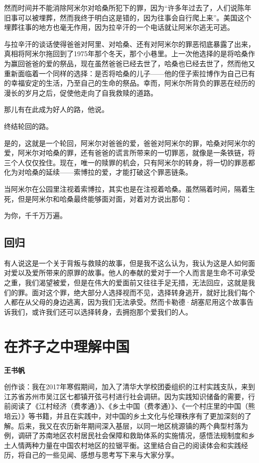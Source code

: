 \documentclass[openany,scheme = chinese, linespread = 1.5]{ctexbook}
\newcommand \name[1]{\begin{center} \kaishu \Large \bfseries #1 \end{center}}
\begin{document}
然而时间并不能消除阿米尔对哈桑所犯下的罪，因为“许多年过去了，人们说陈年旧事可以被埋葬，然而我终于明白这是错的，因为往事会自行爬上来”。美国这个埋葬往事的地方也毫无作用，因为拉辛汗的一个电话就让阿米尔逃无可逃。

与拉辛汗的谈话使得爸爸对阿里、对哈桑、还有对阿米尔的罪恶彻底暴露了出来，真相将阿米尔拖回到了1975年那个冬天，那个小巷里。上一次他选择的是将哈桑作为赢回爸爸的爱的祭品，现在虽然爸爸已经去世了，哈桑也已经去世了，然而他又重新面临着一个同样的选择：是否将哈桑的儿子——他的侄子索拉博作为自己已有的幸福安定的生活，乃至自己的生命的祭品。幸而，阿米尔所背负的罪恶在经历的漫长的岁月之后，促使他走向了自我救赎的道路。

那儿有在此成为好人的路，他说。

终结轮回的路。

是的，这就是一个轮回，阿米尔对爸爸的爱，爸爸对阿米尔的罪，哈桑对阿米尔的爱，阿米尔对哈桑的罪，还有爸爸的谎言所带来的一切罪恶，就像是一条铁链，将三个人仅仅拴住。现在，唯一的赎罪的机会，只有阿米尔的转身，将一切的罪恶都化为对哈桑的延续——索博拉的爱，才能打破这个罪恶链条。

当阿米尔在公园里注视着索博拉，其实也是在注视着哈桑。虽然隔着时间，隔着生死，但是阿米尔和哈桑最终能够面对面，对着对方说出那句：

为你，千千万万遍。

\subsection*{回归}

有人说这是一个关于背叛与救赎的故事，但是我不这么认为，我认为这是人如何面对爱以及爱所带来的原罪的故事。他人的奉献的爱对于一个人而言是生命不可承受之重，我们渴望被爱，但是在伟大的爱面前又往往手足无措，无法回应，这就是我们的罪。面对这个罪，绝大部分人选择视而不见，选择转身逃开，就好比我们每个人都在从父母的身边逃离，因为我们无法承受。然而卡勒德·胡塞尼用这个故事告诉我们，或许我们还可以选择转身，去拥抱那个爱我们的人。

\newpage
\section{在芥子之中理解中国}
\name{王书帆}

创作谈：我在2017年寒假期间，加入了清华大学校团委组织的江村实践支队，来到江苏省苏州市吴江区七都镇开弦弓村进行社会调研。因为实践知识储备的需要，行前阅读了《江村经济（费孝通）》、《乡土中国（费孝通）》、《一个村庄里的中国（熊培云）》等书籍，并且在实践中，对中国的乡土文化与伦理秩序有了更加深刻的了解。后来，我又在农历新年期间深入基层，以同一地区桃源镇的两个典型村落为例，调研了苏南地区农村居民社会保障和救助体系的实施情况，感悟法规制度和乡土人情两种力量在中国农村地区的拉锯平衡。这里结合自己的阅读体会和实践经历，将自己的一些见闻、感想与思考写下来与大家分享。
\end{document}
